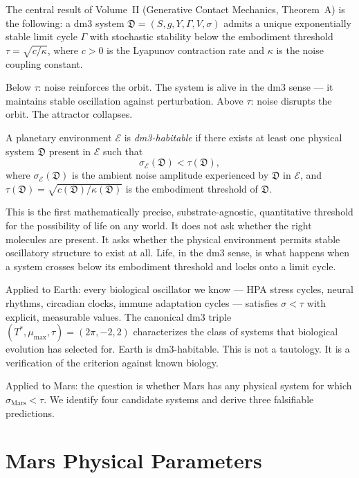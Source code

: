 The central result of Volume~II (Generative Contact Mechanics, Theorem~A)
is the following: a dm3 system $\mathfrak{D} = (S, g, Y, \Gamma, V, \sigma)$
admits a unique exponentially stable limit cycle $\Gamma$ with stochastic
stability below the embodiment threshold $\tau = \sqrt{c/\kappa}$, where
$c > 0$ is the Lyapunov contraction rate and $\kappa$ is the noise
coupling constant.

Below $\tau$: noise reinforces the orbit. The system is alive in the
dm3 sense --- it maintains stable oscillation against perturbation.
Above $\tau$: noise disrupts the orbit. The attractor collapses.

\begin{definition}
\label{def:habitability}
A planetary environment $\mathcal{E}$ is \emph{dm3-habitable} if there
exists at least one physical system $\mathfrak{D}$ present in $\mathcal{E}$
such that
\[
\sigma_{\mathcal{E}}(\mathfrak{D}) < \tau(\mathfrak{D}),
\]
where $\sigma_{\mathcal{E}}(\mathfrak{D})$ is the ambient noise amplitude
experienced by $\mathfrak{D}$ in $\mathcal{E}$, and
$\tau(\mathfrak{D}) = \sqrt{c(\mathfrak{D})/\kappa(\mathfrak{D})}$
is the embodiment threshold of $\mathfrak{D}$.
\end{definition}

This is the first mathematically precise, substrate-agnostic, quantitative
threshold for the possibility of life on any world. It does not ask
whether the right molecules are present. It asks whether the physical
environment permits stable oscillatory structure to exist at all. Life,
in the dm3 sense, is what happens when a system crosses below its
embodiment threshold and locks onto a limit cycle.

Applied to Earth: every biological oscillator we know --- HPA stress
cycles, neural rhythms, circadian clocks, immune adaptation cycles ---
satisfies $\sigma < \tau$ with explicit, measurable values. The
canonical dm3 triple $(T^*, \mu_{\max}, \tau) = (2\pi, -2, 2)$
characterizes the class of systems that biological evolution has
selected for. Earth is dm3-habitable. This is not a tautology. It is
a verification of the criterion against known biology.

Applied to Mars: the question is whether Mars has any physical system
for which $\sigma_{\text{Mars}} < \tau$. We identify four candidate
systems and derive three falsifiable predictions.

\section{Mars Physical Parameters}
\label{sec:mars-params}

